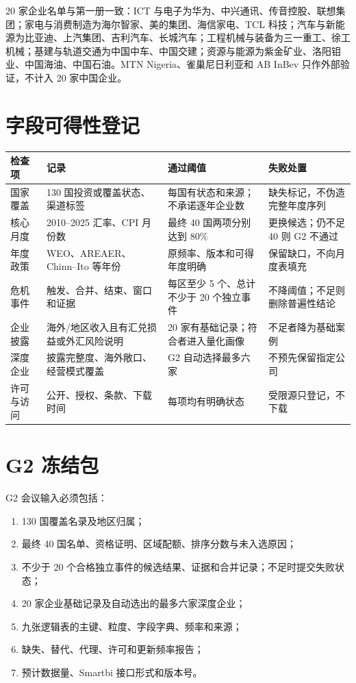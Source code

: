 \documentclass[UTF8,12pt,openany]{ctexbook}
\begin{document}
20 家企业名单与第一册一致：ICT 与电子为华为、中兴通讯、传音控股、联想集团；家电与消费制造为海尔智家、美的集团、海信家电、TCL 科技；汽车与新能源为比亚迪、上汽集团、吉利汽车、长城汽车；工程机械与装备为三一重工、徐工机械；基建与轨道交通为中国中车、中国交建；资源与能源为紫金矿业、洛阳钼业、中国海油、中国石油。MTN Nigeria、雀巢尼日利亚和 AB InBev 只作外部验证，不计入 20 家中国企业。

\section{字段可得性登记}
\begin{longtable}{p{3.1cm}p{3.8cm}p{3.5cm}p{3.6cm}}
\toprule
\textbf{检查项} & \textbf{记录} & \textbf{通过阈值} & \textbf{失败处置}\\
\midrule
国家覆盖 & 130 国投资或覆盖状态、渠道标签 & 每国有状态和来源；不承诺逐年企业数 & 缺失标记，不伪造完整年度序列\\
核心月度 & 2010--2025 汇率、CPI 月份数 & 最终 40 国两项分别达到 80\% & 更换候选；仍不足 40 则 G2 不通过\\
年度政策 & WEO、AREAER、Chinn--Ito 等年份 & 原频率、版本和可得年度明确 & 保留缺口，不向月度表填充\\
危机事件 & 触发、合并、结束、窗口和证据 & 每区至少 5 个、总计不少于 20 个独立事件 & 不降阈值；不足则删除普遍性结论\\
企业披露 & 海外/地区收入且有汇兑损益或外汇风险说明 & 20 家有基础记录；符合者进入量化画像 & 不足者降为基础案例\\
深度企业 & 披露完整度、海外敞口、经营模式覆盖 & G2 自动选择最多六家 & 不预先保留指定公司\\
许可与访问 & 公开、授权、条款、下载时间 & 每项均有明确状态 & 受限源只登记，不下载\\
\bottomrule
\end{longtable}

\section{G2 冻结包}
G2 会议输入必须包括：

\begin{enumerate}
  \item 130 国覆盖名录及地区归属；
  \item 最终 40 国名单、资格证明、区域配额、排序分数与未入选原因；
  \item 不少于 20 个合格独立事件的候选结果、证据和合并记录；不足时提交失败状态；
  \item 20 家企业基础记录及自动选出的最多六家深度企业；
  \item 九张逻辑表的主键、粒度、字段字典、频率和来源；
  \item 缺失、替代、代理、许可和更新频率报告；
  \item 预计数据量、Smartbi 接口形式和版本号。
\end{enumerate}
\end{document}
